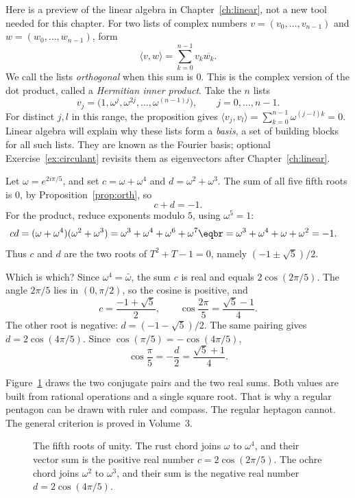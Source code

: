 Here is a preview of the linear algebra in Chapter~\ref{ch:linear}, not a new tool needed for this chapter. For two lists of complex numbers $v=(v_0,\dots,v_{n-1})$ and $w=(w_0,\dots,w_{n-1})$, form
\[
\langle v,w\rangle=\sum_{k=0}^{n-1}v_k\overline{w_k}.
\]
We call the lists \emph{orthogonal} when this sum is $0$. This is the complex version of the dot product, called a \emph{Hermitian inner product}. Take the $n$ lists
\[
v_j=\bigl(1,\omega^j,\omega^{2j},\dots,\omega^{(n-1)j}\bigr),\qquad j=0,\dots,n-1.
\]
For distinct $j,l$ in this range, the proposition gives $\langle v_j,v_l\rangle=\sum_{k=0}^{n-1}\omega^{(j-l)k}=0$. Linear algebra will explain why these lists form a \emph{basis}, a set of building blocks for all such lists. They are known as the Fourier basis; optional Exercise~\ref{ex:circulant} revisits them as eigenvectors after Chapter~\ref{ch:linear}.

\begin{examplex}
Let $\omega=e^{2i\pi/5}$, and set $c=\omega+\omega^4$ and $d=\omega^2+\omega^3$. The sum of all five fifth roots is $0$, by Proposition~\ref{prop:orth}, so
\[
c+d=-1.
\]
For the product, reduce exponents modulo $5$, using $\omega^5=1$:
\begin{align*}
cd&=(\omega+\omega^4)(\omega^2+\omega^3)=\omega^3+\omega^4+\omega^6+\omega^7\eqbr=\omega^3+\omega^4+\omega+\omega^2=-1.
\end{align*}
Thus $c$ and $d$ are the two roots of $T^2+T-1=0$, namely $(-1\pm\sqrt5)/2$.

Which is which? Since $\omega^4=\bar\omega$, the sum $c$ is real and equals $2\cos(2\pi/5)$. The angle $2\pi/5$ lies in $(0,\pi/2)$, so the cosine is positive, and
\[
c=\frac{-1+\sqrt5}2,\qquad\cos\frac{2\pi}5=\frac{\sqrt5-1}4.
\]
The other root is negative: $d=(-1-\sqrt5)/2$. The same pairing gives $d=2\cos(4\pi/5)$. Since $\cos(\pi/5)=-\cos(4\pi/5)$,
\[
\cos\frac\pi5=-\frac d2=\frac{\sqrt5+1}4.
\]
\end{examplex}

Figure~\ref{fig:pentagon} draws the two conjugate pairs and the two real sums. Both values are built from rational operations and a single square root. That is why a regular pentagon can be drawn with ruler and compass. The regular heptagon cannot. The general criterion is proved in Volume~3.

\begin{figure}[ht]
\centering
{}
\caption{The fifth roots of unity. The rust chord joins $\omega$ to $\omega^4$, and their vector sum is the positive real number $c=2\cos(2\pi/5)$. The ochre chord joins $\omega^2$ to $\omega^3$, and their sum is the negative real number $d=2\cos(4\pi/5)$.}
\label{fig:pentagon}
\end{figure}

